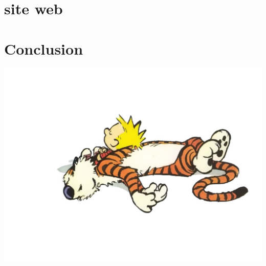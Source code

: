 \documentclass[12pt,a4paper]{report}
\begin{document}
\chapter{site web}


\chapter{Conclusion}


\begin{center}
\includegraphics[scale =0.5]{conclu.jpg}
\end{center}
\end{document}
